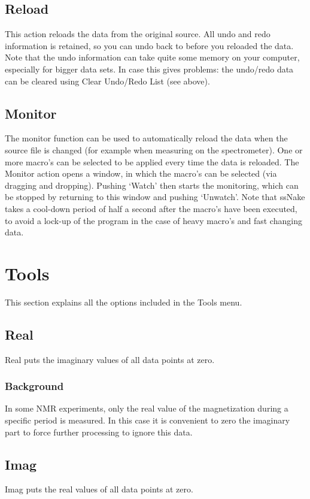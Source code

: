 \documentclass[11pt,a4paper]{article}
\begin{document}
\subsection{Reload}
This action reloads the data from the original source. All undo and redo information is retained, so you can undo back to before you
reloaded the data. Note that the undo information can take quite some memory on your computer, especially for bigger data sets. In case
this gives problems: the undo/redo data can be cleared using Clear Undo/Redo List (see above).

\subsection{Monitor}
The monitor function can be used to automatically reload the data when the source file is changed (for example when measuring on the spectrometer). One or more macro's can be selected to be applied every time the data is reloaded. The Monitor action opens a window, in which the macro's can be selected (via dragging and dropping). Pushing `Watch' then starts the monitoring, which can be stopped by returning to this window and pushing `Unwatch'. Note that ssNake takes a cool-down period of half a second after the macro's have been executed, to avoid a lock-up of the program in the case of heavy macro's and fast changing data.


\section{Tools}
This section explains all the options included in the Tools menu. 

\subsection{Real}
Real puts the imaginary values of all data points at zero.

\subsubsection*{Background}
In some NMR experiments, only the real value of the magnetization during a specific period is measured. In this case it is convenient to zero the imaginary part to force further processing to ignore this data.


\subsection{Imag}
Imag puts the real values of all data points at zero.
\end{document}
